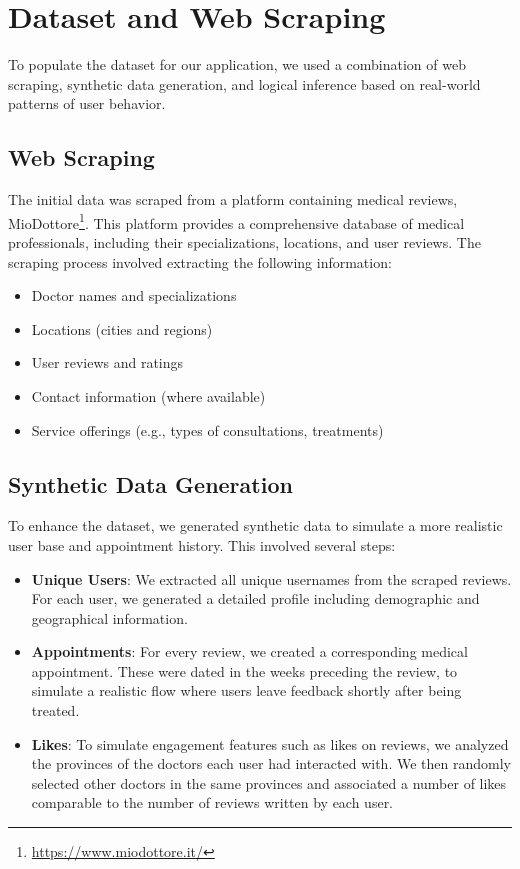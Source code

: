 \section{Dataset and Web Scraping}
To populate the dataset for our application, we used a combination of web scraping, synthetic data generation, and logical inference based on real-world patterns of user behavior.

\subsection{Web Scraping}
The initial data was scraped from a platform containing medical reviews, MioDottore\footnote{\url{https://www.miodottore.it/}}. This platform provides a comprehensive database of medical professionals, including their specializations, locations, and user reviews. The scraping process involved extracting the following information:
\begin{itemize}
    \item Doctor names and specializations
    \item Locations (cities and regions)
    \item User reviews and ratings
    \item Contact information (where available)
    \item Service offerings (e.g., types of consultations, treatments)
\end{itemize}

\subsection{Synthetic Data Generation}
To enhance the dataset, we generated synthetic data to simulate a more realistic user base and appointment history.
This involved several steps:
\begin{itemize}
    \item \textbf{Unique Users}: We extracted all unique usernames from the scraped reviews. For each user, we generated a detailed profile including demographic and geographical information.
    \item \textbf{Appointments}: For every review, we created a corresponding medical appointment. These were dated in the weeks preceding the review, to simulate a realistic flow where users leave feedback shortly after being treated.
    \item \textbf{Likes}: To simulate engagement features such as likes on reviews, we analyzed the provinces of the doctors each user had interacted with. We then randomly selected other doctors in the same provinces and associated a number of likes comparable to the number of reviews written by each user.
\end{itemize}
    
